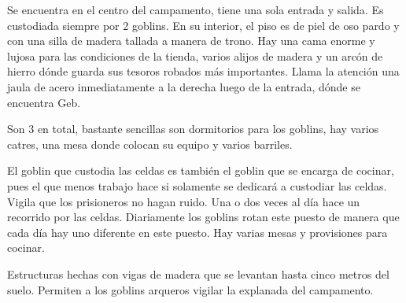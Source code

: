 \documentclass[10pt,twoside,twocolumn,openany]{dndbook}
\begin{document}
Se encuentra en el centro del campamento, tiene una sola entrada y salida. Es custodiada siempre por 2 goblins. En su interior, el piso es de piel de oso pardo y con una silla de madera tallada a manera de trono. Hay una cama enorme y lujosa para las condiciones de la tienda, varios alijos de madera y un arcón de hierro dónde guarda sus tesoros robados más importantes. Llama la atención una jaula de acero inmediatamente a la derecha luego de la entrada, dónde se encuentra Geb.

Son 3 en total, bastante sencillas son dormitorios para los goblins, hay varios catres, una mesa donde colocan su equipo y varios barriles.

El goblin que custodia las celdas es también el goblin que se encarga de cocinar, pues el que menos trabajo hace si solamente se dedicará a custodiar las celdas. Vigila que los prisioneros no hagan ruido. Una o dos veces al día hace un recorrido por las celdas. Diariamente los goblins rotan este puesto de manera que cada día hay uno diferente en este puesto. Hay varias mesas y provisiones para cocinar.

Estructuras hechas con vigas de madera que se levantan hasta cinco metros del suelo. Permiten a los goblins arqueros vigilar la explanada del campamento.
\end{document}
